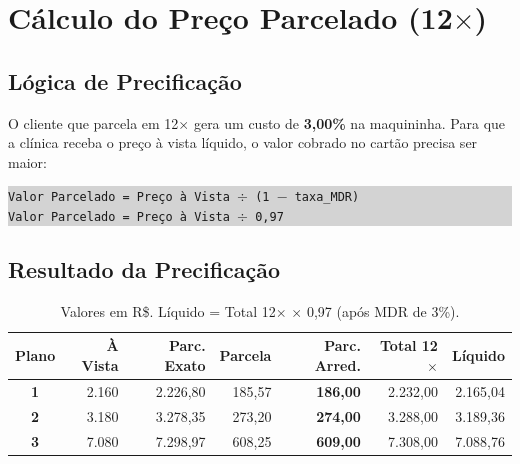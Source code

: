 \documentclass[12pt, a4paper]{article}
\begin{document}
\needspace{10cm}

\section{Cálculo do Preço Parcelado (12$\times$)}

\subsection{Lógica de Precificação}

O cliente que parcela em 12$\times$ gera um custo de \textbf{3,00\%} na maquininha. Para que a clínica receba o preço à vista líquido, o valor cobrado no cartão precisa ser maior:

\begin{center}
\colorbox{lightGray}{%
    \parbox{0.85\textwidth}{%
        \centering
        \vspace{0.3cm}
        \texttt{Valor Parcelado = Preço à Vista $\div$ (1 $-$ taxa\_MDR)} \\
        \vspace{0.1cm}
        \texttt{Valor Parcelado = Preço à Vista $\div$ 0,97} \\
        \vspace{0.3cm}
    }%
}
\end{center}

\subsection{Resultado da Precificação}

\begin{table}[H]
    \centering
    \footnotesize
    \renewcommand{\arraystretch}{1.4}
    \begin{tabularx}{\textwidth}{c r r r r r r}
        \toprule
        \rowcolor{tableHeader} \textbf{Plano} & \textbf{À Vista} & \textbf{Parc. Exato} & \textbf{Parcela} & \textbf{Parc. Arred.} & \textbf{Total 12$\times$} & \textbf{Líquido} \\
        \midrule
        \textbf{1} & 2.160 & 2.226,80 & 185,57 & \textbf{186,00} & 2.232,00 & 2.165,04 \\
        \rowcolor{lightGray}
        \textbf{2} & 3.180 & 3.278,35 & 273,20 & \textbf{274,00} & 3.288,00 & 3.189,36 \\
        \textbf{3} & 7.080 & 7.298,97 & 608,25 & \textbf{609,00} & 7.308,00 & 7.088,76 \\
        \bottomrule
    \end{tabularx}
    \caption*{\footnotesize Valores em R\$. Líquido = Total 12$\times$ $\times$ 0,97 (após MDR de 3\%).}
\end{table}
\end{document}
